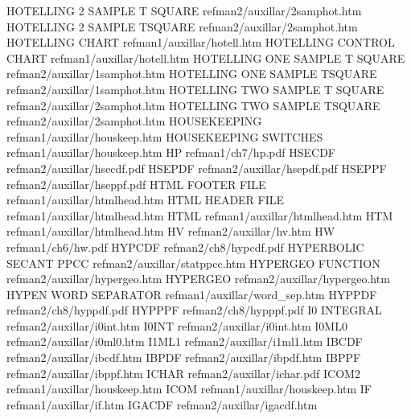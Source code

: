 HOTELLING 2 SAMPLE T SQUARE             refman2/auxillar/2samphot.htm
HOTELLING 2 SAMPLE TSQUARE              refman2/auxillar/2samphot.htm
HOTELLING CHART                         refman1/auxillar/hotell.htm
HOTELLING CONTROL CHART                 refman1/auxillar/hotell.htm
HOTELLING ONE SAMPLE T SQUARE           refman2/auxillar/1samphot.htm
HOTELLING ONE SAMPLE TSQUARE            refman2/auxillar/1samphot.htm
HOTELLING TWO SAMPLE T SQUARE           refman2/auxillar/2samphot.htm
HOTELLING TWO SAMPLE TSQUARE            refman2/auxillar/2samphot.htm
HOUSEKEEPING                            refman1/auxillar/houskeep.htm
HOUSEKEEPING SWITCHES                   refman1/auxillar/houskeep.htm
HP                                      refman1/ch7/hp.pdf
HSECDF                                  refman2/auxillar/hsecdf.pdf
HSEPDF                                  refman2/auxillar/hsepdf.pdf
HSEPPF                                  refman2/auxillar/hseppf.pdf
HTML FOOTER FILE                        refman1/auxillar/htmlhead.htm
HTML HEADER FILE                        refman1/auxillar/htmlhead.htm
HTML                                    refman1/auxillar/htmlhead.htm
HTM                                     refman1/auxillar/htmlhead.htm
HV                                      refman2/auxillar/hv.htm
HW                                      refman1/ch6/hw.pdf
HYPCDF                                  refman2/ch8/hypcdf.pdf
HYPERBOLIC SECANT PPCC                  refman2/auxillar/statppcc.htm
HYPERGEO FUNCTION                       refman2/auxillar/hypergeo.htm
HYPERGEO                                refman2/auxillar/hypergeo.htm
HYPEN WORD SEPARATOR                    refman1/auxillar/word_sep.htm
HYPPDF                                  refman2/ch8/hyppdf.pdf
HYPPPF                                  refman2/ch8/hypppf.pdf
I0 INTEGRAL                             refman2/auxillar/i0int.htm
I0INT                                   refman2/auxillar/i0int.htm
I0ML0                                   refman2/auxillar/i0ml0.htm
I1ML1                                   refman2/auxillar/i1ml1.htm
IBCDF                                   refman2/auxillar/ibcdf.htm
IBPDF                                   refman2/auxillar/ibpdf.htm
IBPPF                                   refman2/auxillar/ibppf.htm
ICHAR                                   refman2/auxillar/ichar.pdf
ICOM2                                   refman1/auxillar/houskeep.htm
ICOM                                    refman1/auxillar/houskeep.htm
IF                                      refman1/auxillar/if.htm
IGACDF                                  refman2/auxillar/igacdf.htm
